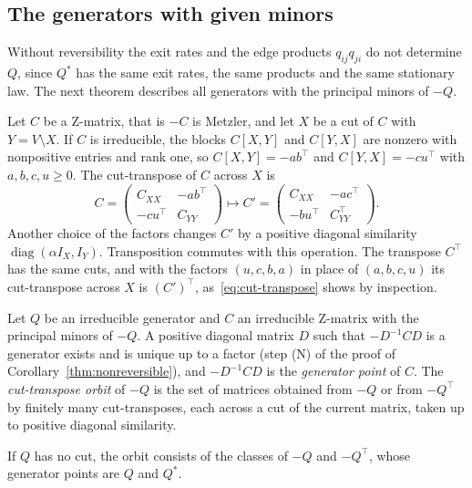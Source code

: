 \subsection{The generators with given minors}\label{sec:fiber}

Without reversibility the exit rates and the edge products $q_{ij}q_{ji}$ do not determine
$Q$, since $Q^*$ has the same exit rates, the same products and the same stationary law.
The next theorem describes all generators with the principal minors of $-Q$.

Let $C$ be a Z-matrix, that is $-C$ is Metzler, and let $X$ be a cut of $C$ with
$Y=V\setminus X$. If $C$ is irreducible, the blocks $C[X,Y]$ and $C[Y,X]$ are nonzero with
nonpositive entries and rank one, so $C[X,Y]=-ab^\top$ and $C[Y,X]=-cu^\top$ with
$a,b,c,u\ge0$. The cut-transpose of $C$ across $X$ is
\begin{equation}\label{eq:cut-transpose}
 C=\begin{pmatrix}C_{XX}&-ab^\top\\-cu^\top&C_{YY}\end{pmatrix}\mapsto
 C'=\begin{pmatrix}C_{XX}&-ac^\top\\-bu^\top&C_{YY}^\top\end{pmatrix}.
\end{equation}
Another choice of the factors changes $C'$ by a positive diagonal similarity
$\operatorname{diag}(\alpha I_X,I_Y)$. Transposition commutes with this operation. The
transpose $C^\top$ has the same cuts, and with the factors $(u,c,b,a)$ in place of $(a,b,c,u)$
its cut-transpose across $X$ is $(C')^\top$, as~\eqref{eq:cut-transpose} shows by inspection.

\begin{definition}\label{def:orbit}
Let $Q$ be an irreducible generator and $C$ an irreducible Z-matrix with the principal minors of
$-Q$. A positive diagonal matrix $D$ such that $-D^{-1}CD$ is a generator exists and is unique up
to a factor (step (N) of the proof of Corollary~\ref{thm:nonreversible}), and $-D^{-1}CD$ is the
\emph{generator point} of $C$. The \emph{cut-transpose orbit} of $-Q$ is the set of matrices
obtained from $-Q$ or from $-Q^\top$ by finitely many cut-transposes, each across a cut of the
current matrix, taken up to positive diagonal similarity.
\end{definition}

If $Q$ has no cut, the orbit consists of the classes of $-Q$ and $-Q^\top$, whose generator
points are $Q$ and $Q^*$.

